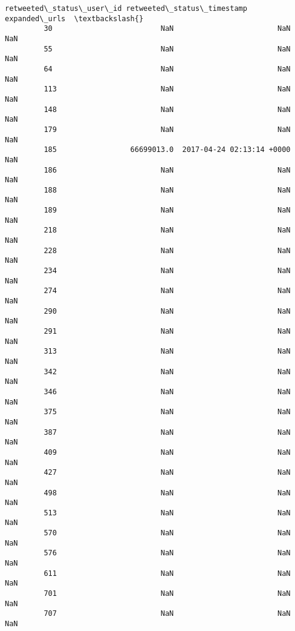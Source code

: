 \documentclass[11pt]{article}
\begin{document}
\begin{Verbatim}[commandchars=\\\{\}]
               retweeted\_status\_user\_id retweeted\_status\_timestamp expanded\_urls  \textbackslash{}
         30                         NaN                        NaN           NaN   
         55                         NaN                        NaN           NaN   
         64                         NaN                        NaN           NaN   
         113                        NaN                        NaN           NaN   
         148                        NaN                        NaN           NaN   
         179                        NaN                        NaN           NaN   
         185                 66699013.0  2017-04-24 02:13:14 +0000           NaN   
         186                        NaN                        NaN           NaN   
         188                        NaN                        NaN           NaN   
         189                        NaN                        NaN           NaN   
         218                        NaN                        NaN           NaN   
         228                        NaN                        NaN           NaN   
         234                        NaN                        NaN           NaN   
         274                        NaN                        NaN           NaN   
         290                        NaN                        NaN           NaN   
         291                        NaN                        NaN           NaN   
         313                        NaN                        NaN           NaN   
         342                        NaN                        NaN           NaN   
         346                        NaN                        NaN           NaN   
         375                        NaN                        NaN           NaN   
         387                        NaN                        NaN           NaN   
         409                        NaN                        NaN           NaN   
         427                        NaN                        NaN           NaN   
         498                        NaN                        NaN           NaN   
         513                        NaN                        NaN           NaN   
         570                        NaN                        NaN           NaN   
         576                        NaN                        NaN           NaN   
         611                        NaN                        NaN           NaN   
         701                        NaN                        NaN           NaN   
         707                        NaN                        NaN           NaN   

\end{Verbatim}
\end{document}
